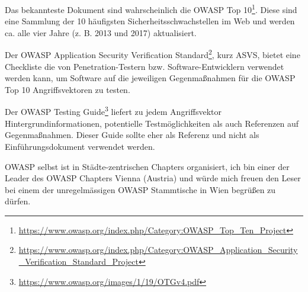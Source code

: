 Das bekannteste Dokument sind wahrscheinlich die OWASP Top 10\footnote{\url{https://www.owasp.org/index.php/Category:OWASP_Top_Ten_Project}}. Diese sind eine Sammlung der 10 häufigsten Sicherheitsschwachstellen im Web und werden ca. alle vier Jahre (z. B. 2013 und 2017) aktualisiert.

Der OWASP Application Security Verification Standard\footnote{\url{https://www.owasp.org/index.php/Category:OWASP_Application_Security_Verification_Standard_Project}}, kurz ASVS, bietet eine Checkliste die von Penetration-Testern bzw. Software-Entwicklern verwendet werden kann, um Software auf die jeweiligen Gegenmaßnahmen für die OWASP Top 10 Angriffsvektoren zu testen.

Der OWASP Testing Guide\footnote{\url{https://www.owasp.org/images/1/19/OTGv4.pdf}} liefert zu jedem Angriffsvektor Hintergrundinformationen, potentielle Testmöglichkeiten als auch Referenzen auf Gegenmaßnahmen. Dieser Guide sollte eher als Referenz und nicht als Einführungsdokument verwendet werden.

OWASP selbst ist in Städte-zentrischen Chapters organisiert, ich bin einer der Leader des OWASP Chapters Vienna (Austria) und würde mich freuen den Leser bei einem der unregelmässigen OWASP Stammtische in Wien begrüßen zu dürfen.

